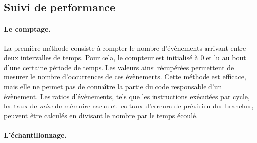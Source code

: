     \subsection{Suivi de performance}\label{sec:sampling}
    
            \paragraph{Le comptage.} 
                
                La première méthode consiste à compter le nombre d'évènements arrivant entre deux intervalles de temps. Pour cela, le compteur est initialisé à $0$ et lu au bout d'une certaine période de temps. Les valeurs ainsi récupérées permettent de mesurer le nombre d'occurrences de ces évènements. Cette méthode est efficace, mais elle ne permet pas de connaître la partie du code responsable d'un évènement. Les ratios d'évènements, tels que les instructions exécutées par cycle, les taux de \textit{miss} de mémoire cache et les taux d'erreurs de prévision des branches, peuvent être calculés en divisant le nombre par le temps écoulé.
            
            \paragraph{L'échantillonnage.} 
            
